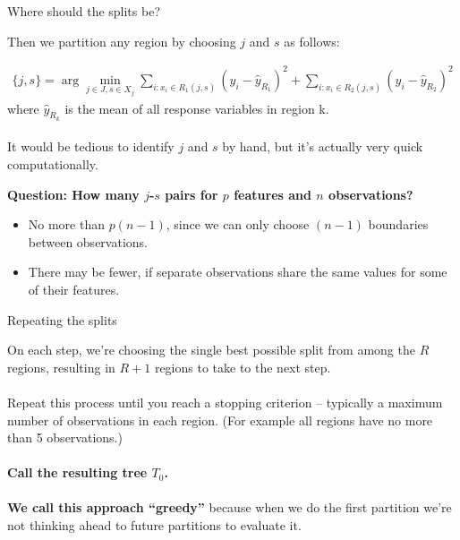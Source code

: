 \documentclass[mathserif, aspectratio=169]{beamer}
\begin{document}
\begin{frame}{Where should the splits be?}

Then we partition any region by choosing $j$ and $s$ as follows:

\begin{align*}
\{j,s\} = \arg \min_{j\in J, s\in X_j} \sum_{i:x_i\in R_1(j,s)} (y_i-\hat{y}_{R_1})^2 + \sum_{i:x_i\in R_2(j,s)} (y_i-\hat{y}_{R_2})^2
\end{align*}
where $\hat{y}_{R_k}$ is the mean of all response variables in region k.  \\~\\

It would be tedious to identify $j$ and $s$ by hand, but it's actually very quick computationally.  

\vspace{5mm}
\textbf{Question:  How many $j$-$s$ pairs for $p$ features and $n$ observations?} \pause 
\begin{itemize}
	\item No more than $p(n-1)$, since we can only choose $(n-1)$ boundaries between observations.  
	\item There may be fewer, if separate observations share the same values for some of their features.
\end{itemize}
\end{frame}

\begin{frame}{Repeating the splits}

On each step, we're choosing the single best possible split from among the $R$ regions, resulting in $R+1$ regions to take to the next step. \\~\\

Repeat this process until you reach a stopping criterion -- typically a maximum number of observations in each region. (For example all regions have no more than 5 observations.) \\~\\ 

\textbf{Call the resulting tree $T_0$.} \\~\\

\textbf{We call this approach ``greedy''} because when we do the first partition we're not thinking ahead to future partitions to evaluate it.  


\end{frame}
\end{document}
